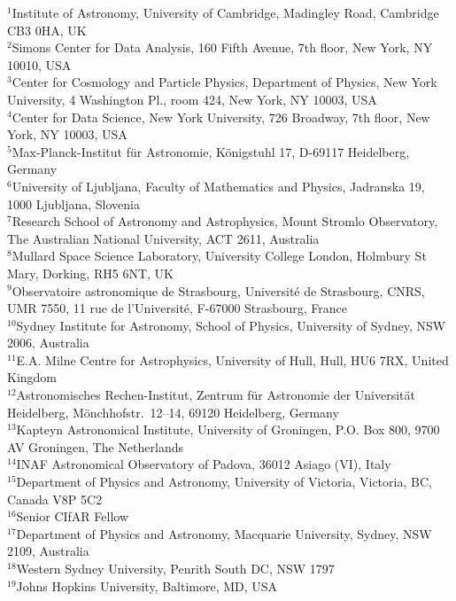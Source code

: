 \documentclass[preprint]{aastex}
\begin{document}
\noindent{}$^{1}${Institute of Astronomy, University of Cambridge, Madingley Road, Cambridge CB3 0HA, UK} \\
$^{2}${Simons Center for Data Analysis, 160 Fifth Avenue, 7th floor, New York, NY 10010, USA} \\
$^{3}${Center for Cosmology and Particle Physics, Department of Physics, New York University, 4 Washington Pl., room 424, New York, NY 10003, USA} \\
$^{4}${Center for Data Science, New York University, 726 Broadway, 7th floor, New York, NY 10003, USA} \\
$^{5}${Max-Planck-Institut f\"ur Astronomie, K\"onigstuhl 17, D-69117 Heidelberg, Germany} \\
$^{6}${University of Ljubljana, Faculty of Mathematics and Physics, Jadranska 19, 1000 Ljubljana, Slovenia} \\
$^{7}${Research School of Astronomy and Astrophysics, Mount Stromlo Observatory, The Australian National University, ACT 2611, Australia} \\
$^{8}${Mullard Space Science Laboratory, University College London, Holmbury St Mary, Dorking, RH5 6NT, UK} \\
$^{9}${Observatoire astronomique de Strasbourg, Universit\'e de Strasbourg, CNRS, UMR 7550, 11 rue de l'Universit\'e, F-67000 Strasbourg, France} \\
$^{10}${Sydney Institute for Astronomy, School of Physics, University of Sydney, NSW 2006, Australia} \\
$^{11}${E.A. Milne Centre for Astrophysics, University of Hull, Hull, HU6 7RX, United Kingdom} \\
$^{12}${Astronomisches Rechen-Institut, Zentrum f\"ur Astronomie der Universit\"at Heidelberg, M\"onchhofstr.\ 12--14, 69120 Heidelberg, Germany} \\
$^{13}${Kapteyn Astronomical Institute, University of Groningen, P.O. Box 800, 9700 AV Groningen, The Netherlands} \\
$^{14}${INAF Astronomical Observatory of Padova, 36012 Asiago (VI), Italy} \\
$^{15}${Department of Physics and Astronomy, University of Victoria, Victoria, BC, Canada V8P 5C2} \\
$^{16}${Senior CIfAR Fellow} \\
$^{17}${Department of Physics and Astronomy, Macquarie University, Sydney, NSW 2109, Australia} \\
$^{18}${Western Sydney University, Penrith South DC, NSW 1797} \\
$^{19}${Johns Hopkins University, Baltimore, MD, USA} \\
\end{document}
